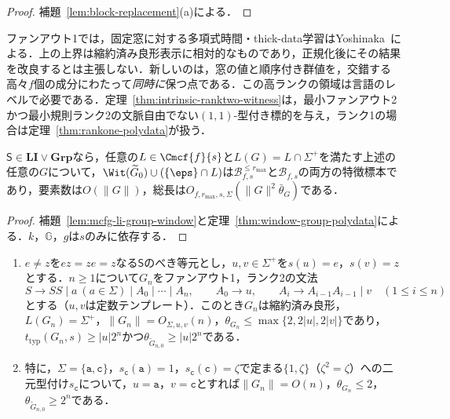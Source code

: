 \begin{proof}
補題~\ref{lem:block-replacement}(a)による．
\end{proof}

ファンアウト1では，固定窓に対する多項式時間・thick-data学習はYoshinaka~\cite[Theorem~1]{Yoshinaka2008}による．上の上界は縮約済み良形表示に相対的なものであり，正規化後にその結果を改良するとは主張しない．新しいのは，窓の値と順序付き群値を，交錯する高々$f$個の成分にわたって\emph{同時に}保つ点である．この高ランクの領域は言語のレベルで必要である．定理~\ref{thm:intrinsic-ranktwo-witness}は，最小ファンアウト2かつ最小規則ランク2の文脈自由でない$(1,1)$-型付き標的を与え，ランク1の場合は定理~\ref{thm:rankone-polydata}が扱う．

\begin{corollary}[多項式データの代数的十分条件]
\label{cor:mcfg-li-group-polydata}
$\mathsf S\in\mathbf{LI}\vee\mathbf{Grp}$なら，任意の$L\in\Cmcf{f}{s}$と$L(G)=L\cap\Sigma^+$を満たす上述の任意の$G$について，$\Wit(\widetilde G_0)\cup(\{\eps\}\cap L)$は$\mathcal B^{\le r_{\max}}_{f,s}$と$\mathcal B_{f,s}$の両方の特徴標本であり，要素数は$O(\|G\|)$，総長は$O_{f,r_{\max},s,\Sigma}(\|G\|^2\bar\theta_G)$である．
\end{corollary}

\begin{proof}
補題~\ref{lem:mcfg-li-group-window}と定理~\ref{thm:window-group-polydata}による．$k$，${\mathbb G}$，$g$は$s$のみに依存する．
\end{proof}

\begin{proposition}[完全生成語型精密化の指数的増大]
\label{prop:typed-thickness-exponential}
\begin{enumerate}[label=\textup{(\alph*)},leftmargin=*]
\item $e\ne z$を$ez=ze=z$なる$\mathsf S$のべき等元とし，$u,v\in\Sigma^+$を$s(u)=e$，$s(v)=z$とする．$n\ge1$について$G_n$をファンアウト1，ランク2の文法
\[
 S\to SS\mid a\ (a\in\Sigma)\mid A_0\mid\cdots\mid A_n,\qquad
 A_0\to u,\qquad
 A_i\to A_{i-1}A_{i-1}\mid v\quad(1\le i\le n)
\]
とする（$u,v$は定数テンプレート）．このとき$G_n$は縮約済み良形，$L(G_n)=\Sigma^+$，$\|G_n\|=O_{\Sigma,u,v}(n)$，$\theta_{G_n}\le\max\{2,2|u|,2|v|\}$であり，$t_{\mathrm{typ}}(G_n,s)\ge|u|2^n$かつ$\theta_{\widetilde G_{n,0}}\ge|u|2^n$である．
\item 特に，$\Sigma=\{\mathtt a,\mathtt c\}$，$s_{\mathtt c}(\mathtt a)=1$，$s_{\mathtt c}(\mathtt c)=\zeta$で定まる$\{1,\zeta\}$（$\zeta^2=\zeta$）への二元型付け$s_{\mathtt c}$について，$u=\mathtt a$，$v=\mathtt c$とすれば$\|G_n\|=O(n)$，$\theta_{G_n}\le2$，$\theta_{\widetilde G_{n,0}}\ge2^n$である．
\end{enumerate}
\end{proposition}

